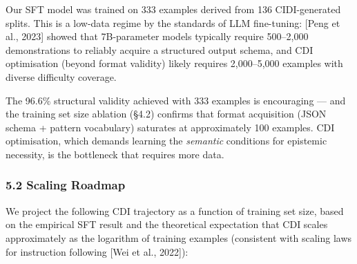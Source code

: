 \documentclass[
  11pt,
]{article}
\begin{document}
Our SFT model was trained on 333 examples derived from 136
CIDI-generated splits. This is a low-data regime by the standards of LLM
fine-tuning: [Peng et al., 2023] showed that 7B-parameter
models typically require 500--2,000 demonstrations to reliably acquire a
structured output schema, and CDI optimisation (beyond format validity)
likely requires 2,000--5,000 examples with diverse difficulty coverage.

The 96.6\% structural validity achieved with 333 examples is encouraging
--- and the training set size ablation (§4.2) confirms that format
acquisition (JSON schema + pattern vocabulary) saturates at
approximately 100 examples. CDI optimisation, which demands learning the
\emph{semantic} conditions for epistemic necessity, is the bottleneck
that requires more data.

\subsubsection{5.2 Scaling Roadmap}\label{scaling-roadmap}

We project the following CDI trajectory as a function of training set
size, based on the empirical SFT result and the theoretical expectation
that CDI scales approximately as the logarithm of training examples
(consistent with scaling laws for instruction following [Wei et
al., 2022]):
\end{document}
